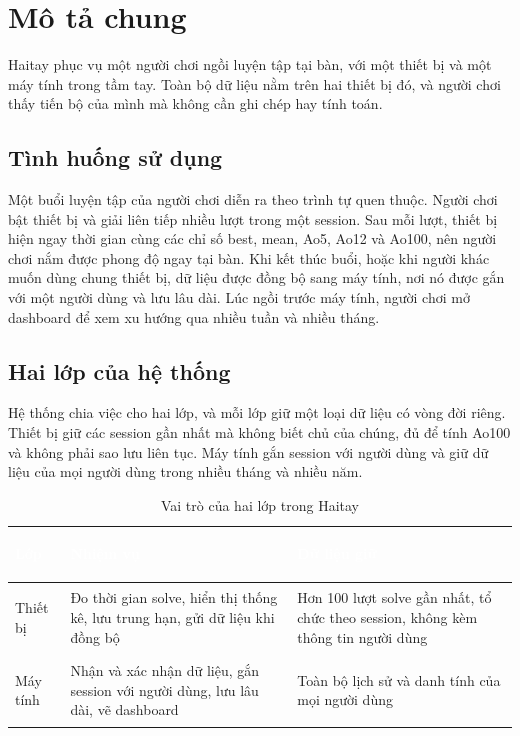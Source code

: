 \section{Mô tả chung}
Haitay phục vụ một người chơi ngồi luyện tập tại bàn, với một thiết bị và một máy tính trong tầm tay. Toàn bộ dữ liệu nằm trên hai thiết bị đó, và người chơi thấy tiến bộ của mình mà không cần ghi chép hay tính toán.

\subsection{Tình huống sử dụng}
Một buổi luyện tập của người chơi diễn ra theo trình tự quen thuộc. Người chơi bật thiết bị và giải liên tiếp nhiều lượt trong một session. Sau mỗi lượt, thiết bị hiện ngay thời gian cùng các chỉ số best, mean, Ao5, Ao12 và Ao100, nên người chơi nắm được phong độ ngay tại bàn. Khi kết thúc buổi, hoặc khi người khác muốn dùng chung thiết bị, dữ liệu được đồng bộ sang máy tính, nơi nó được gắn với một người dùng và lưu lâu dài. Lúc ngồi trước máy tính, người chơi mở dashboard để xem xu hướng qua nhiều tuần và nhiều tháng.

\subsection{Hai lớp của hệ thống}
Hệ thống chia việc cho hai lớp, và mỗi lớp giữ một loại dữ liệu có vòng đời riêng. Thiết bị giữ các session gần nhất mà không biết chủ của chúng, đủ để tính Ao100 và không phải sao lưu liên tục. Máy tính gắn session với người dùng và giữ dữ liệu của mọi người dùng trong nhiều tháng và nhiều năm.

\begin{table}[H]
    \centering
    \renewcommand{\arraystretch}{1.5}
    \caption{Vai trò của hai lớp trong Haitay}
    \label{tab:layers}
    \begin{tabular}{>{\bfseries\raggedright\arraybackslash}m{2.8cm} >{\raggedright\arraybackslash}m{5.8cm} >{\raggedright\arraybackslash}m{5.6cm}}
        \toprule
        \rowcolor{haitayblue}
        \textcolor{white}{Lớp} & \textcolor{white}{Nhiệm vụ} & \textcolor{white}{Dữ liệu giữ} \\
        \midrule
        \rowcolor{haitayblue!8}
        Thiết bị & Đo thời gian solve, hiển thị thống kê, lưu trung hạn, gửi dữ liệu khi đồng bộ & Hơn 100 lượt solve gần nhất, tổ chức theo session, không kèm thông tin người dùng \\
        Máy tính & Nhận và xác nhận dữ liệu, gắn session với người dùng, lưu lâu dài, vẽ dashboard & Toàn bộ lịch sử và danh tính của mọi người dùng \\
        \bottomrule
    \end{tabular}
\end{table}

